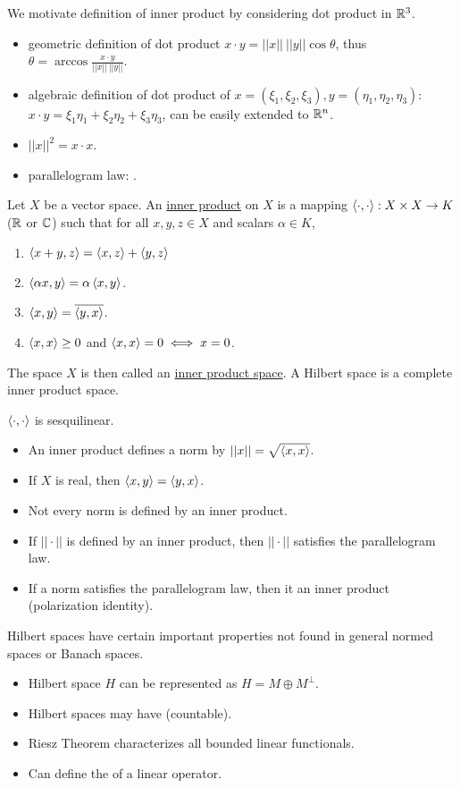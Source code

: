 \documentclass[]{article}
\begin{document}
We motivate definition of inner product by considering dot product in $\mathbb{R}^3$.
\begin{itemize}
	\item geometric definition of dot product $x\cdot y = ||x||\ ||y||\cos\theta$, thus $\theta = \arccos \frac{x\cdot y}{||x||\ ||y||}$.
	\item algebraic definition of dot product of $x=(\xi_1,\xi_2,\xi_3),y = (\eta_1,\eta_2,\eta_3)$: $x\cdot y = \xi_1\eta_1 + \xi_2\eta_2 + \xi_3\eta_3$, can be easily extended to $\mathbb{R}^n$.
	\item $||x||^2 = x\cdot x$.
	\item parallelogram law: .
\end{itemize}
\begin{definition}
	Let $X$ be a vector space. An \ul{inner product} on $X$ is a mapping $\left\langle \cdot,\cdot \right\rangle:X\times X\rightarrow K$ ($\mathbb{R}$ or $\mathbb{C}$) such that for all $x,y,z\in X$ and scalars $\alpha\in K$,
	\begin{enumerate}
		\item $\left\langle x+y,z \right\rangle = \left\langle x,z \right\rangle + \left\langle y,z \right\rangle$
		\item $\left\langle \alpha x,y \right\rangle = \alpha\left\langle x,y \right\rangle$.
		\item $\left\langle x,y \right\rangle = \overline{\left\langle y,x \right\rangle}$.
		\item $\left\langle x,x \right\rangle\geq0$ and $\left\langle x,x \right\rangle=0\iff x=0$.
	\end{enumerate}
	The space $X$ is then called an \ul{inner product space}.
	A Hilbert space is a complete inner product space.
\end{definition}
\begin{remark}
	$\left\langle \cdot,\cdot \right\rangle$ is sesquilinear. %
\end{remark}
\begin{itemize}
	\item An inner product defines a norm by $||x||=\sqrt{\left\langle x,x \right\rangle}$.
	\item If $X$ is real, then $\left\langle x,y \right\rangle = \left\langle y,x \right\rangle$.
	\item Not every norm is defined by an inner product.
	\item If $||\cdot||$ is defined by an inner product, then $||\cdot||$ satisfies the parallelogram law.
	\item If a norm satisfies the parallelogram law, then it  an inner product (polarization identity).
\end{itemize}
Hilbert spaces have certain important properties not found in general normed spaces or Banach spaces.
\begin{itemize}
	\item Hilbert space $H$ can be represented as $H = M\oplus M^\perp$.
	\item Hilbert spaces may have  (countable).
	\item Riesz Theorem characterizes all bounded linear functionals.
	\item Can define the  of a linear operator.
\end{itemize}
\end{document}
